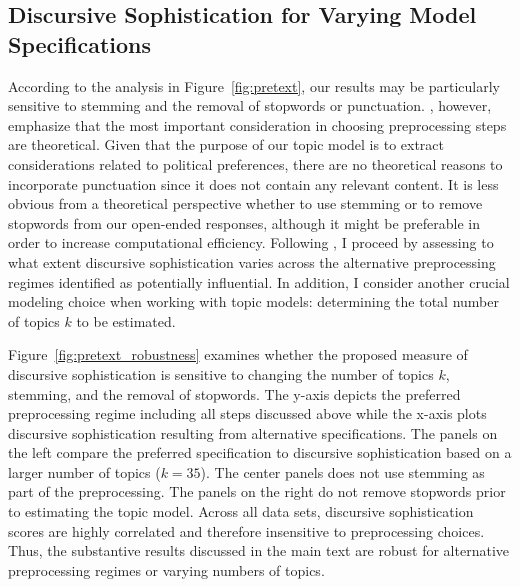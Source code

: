 \documentclass[12pt]{article}
\begin{document}
\clearpage
\subsection{Discursive Sophistication for Varying Model Specifications}

According to the analysis in Figure~\ref{fig:pretext}, our results may be particularly sensitive to stemming and the removal of stopwords or punctuation. \citet{denny2018text}, however, emphasize that the most important consideration in choosing preprocessing steps are theoretical. Given that the purpose of our topic model is to extract considerations related to political preferences, there are no theoretical reasons to incorporate punctuation since it does not contain any relevant content. It is less obvious from a theoretical perspective whether to use stemming or to remove stopwords from our open-ended responses, although it might be preferable in order to increase computational efficiency. Following \citet{denny2018text}, I proceed by assessing to what extent discursive sophistication varies across the alternative preprocessing regimes identified as potentially influential. In addition, I consider another crucial modeling choice when working with topic models: determining the total number of topics $k$ to be estimated.

Figure~\ref{fig:pretext_robustness} examines whether the proposed measure of discursive sophistication is sensitive to changing the number of topics $k$, stemming, and the removal of stopwords. The y-axis depicts the preferred preprocessing regime including all steps discussed above while the x-axis plots discursive sophistication resulting from alternative specifications. The panels on the left compare the preferred specification to discursive sophistication based on a larger number of topics ($k=35$). The center panels does not use stemming as part of the preprocessing. The panels on the right do not remove stopwords prior to estimating the topic model. Across all data sets, discursive sophistication scores are highly correlated and therefore insensitive to preprocessing choices. Thus, the substantive results discussed in the main text are robust for alternative preprocessing regimes or varying numbers of topics.
\end{document}
